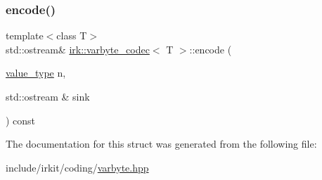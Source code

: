 \subsubsection{\texorpdfstring{encode()}{encode()}}
{\footnotesize\ttfamily template$<$class T$>$ \\
std\+::ostream\& \mbox{\hyperlink{structirk_1_1varbyte__codec}{irk\+::varbyte\+\_\+codec}}$<$ T $>$\+::encode (\begin{DoxyParamCaption}\item[{\mbox{\hyperlink{structirk_1_1varbyte__codec_a362fbaf8b27a38eb23a52a85b1af68ac}{value\+\_\+type}}}]{n,  }\item[{std\+::ostream \&}]{sink }\end{DoxyParamCaption}) const\hspace{0.3cm}{\ttfamily [inline]}}



The documentation for this struct was generated from the following file\+:\begin{DoxyCompactItemize}
\item 
include/irkit/coding/\mbox{\hyperlink{varbyte_8hpp}{varbyte.\+hpp}}\end{DoxyCompactItemize}
